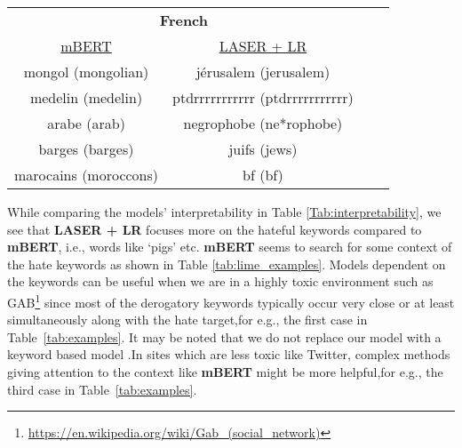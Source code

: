 \documentclass[runningheads]{llncs}
\begin{document}
\begin{table}[!ht]
{\begin{tabular}{cc|cc}
   \multicolumn{2}{c}{\textbf{French}} &\\
    \underline{mBERT}        & \underline{LASER + LR}       &    &  \\
mongol (mongolian)	&   jérusalem  (jerusalem)    	 &    & \\
medelin (medelin)	&   ptdrrrrrrrrrrr (ptdrrrrrrrrrrr)	 &    & \\
arabe (arab)	&   negrophobe (ne*rophobe)	 &    & \\
barges (barges)	&   juifs (jews)	 &    & \\
marocains (moroccons)	&   bf (bf)	 &    & \\
  
\cline{1-2}
\end{tabular}}\end{table}

While comparing the models' interpretability in Table \ref{Tab:interpretability}, we see that \textbf{LASER + LR} focuses more on the hateful keywords compared to \textbf{mBERT}, i.e., words like `pigs' etc. \textbf{mBERT} seems to search for some context of the hate keywords as shown in Table \ref{tab:lime_examples}. Models dependent on the keywords can be useful when we are in a highly toxic environment such as GAB\footnote{\url{https://en.wikipedia.org/wiki/Gab_(social_network)}} since most of the derogatory keywords typically occur very close or at least simultaneously along with the hate target,for e.g., the first case in Table~\ref{tab:examples}. It may be noted that we do not replace our model with a keyword based model .\fi In sites which are less toxic like Twitter, complex methods giving attention to the context like \textbf{mBERT} might be more helpful,for e.g., the third case in Table~\ref{tab:examples}. 
\end{document}
